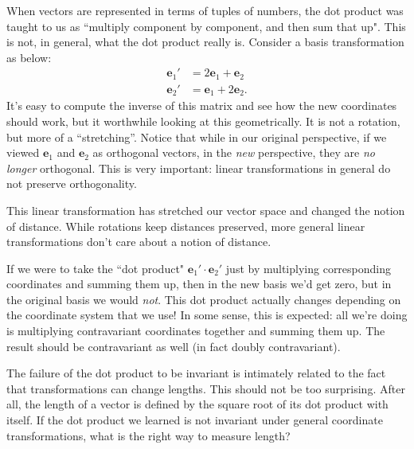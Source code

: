 \documentclass[../master.tex]{subfiles}
\begin{document}
	When vectors are represented in terms of tuples of numbers, the dot product was taught to us as ``multiply component by component, and then sum that up". This is not, in general, what the dot product really is. Consider a basis transformation as below:
	\begin{align*}
		\mathbf e_1' &= 2 \mathbf e_1 + \mathbf e_2 \\
		\mathbf e_2' &=  \mathbf e_1 + 2 \mathbf e_2.
	\end{align*}
	It's easy to compute the inverse of this matrix and see how the new coordinates should work, but it worthwhile looking at this geometrically. It is not a rotation, but more of a ``stretching''. Notice that while in our original perspective, if we viewed $\mathbf e_1$ and $\mathbf e_2$ as orthogonal vectors, in the \emph{new} perspective, they are \emph{no longer} orthogonal. This is very important: linear transformations in general do not preserve orthogonality.
	
	
	This linear transformation has stretched our vector space and changed the notion of distance. While rotations keep distances preserved, more general linear transformations don't care about a notion of distance. 
	
	If we were to take the ``dot product" $\mathbf e_1' \cdot \mathbf e_2'$ just by multiplying corresponding coordinates and summing them up, then in the new basis we'd get zero, but in the original basis we would \emph{not}. This dot product actually changes depending on the coordinate system that we use! In some sense, this is expected: all we're doing is multiplying contravariant coordinates together and summing them up. The result should be contravariant as well (in fact doubly contravariant).
	
	
	The failure of the dot product to be invariant is intimately related to the fact that transformations can change lengths. This should not be too surprising. After all, the length of a vector is defined by the square root of its dot product with itself. If the dot product we learned is not invariant under general coordinate transformations, what is the right way to measure length? 
	
\end{document}
